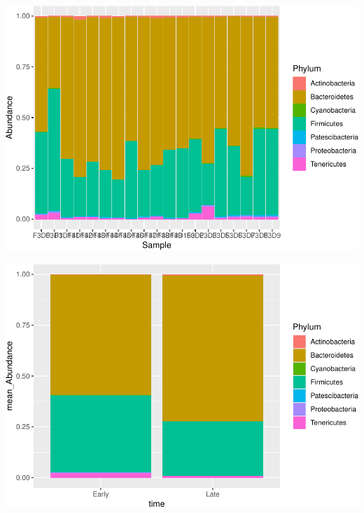 \documentclass[
]{book}
\newenvironment{Shaded}{\begin{snugshade}}{\end{snugshade}}
\newcommand{\DataTypeTok}[1]{\textcolor[rgb]{0.13,0.29,0.53}{#1}}
\newcommand{\KeywordTok}[1]{\textcolor[rgb]{0.13,0.29,0.53}{\textbf{#1}}}
\newcommand{\NormalTok}[1]{#1}
\newcommand{\OperatorTok}[1]{\textcolor[rgb]{0.81,0.36,0.00}{\textbf{#1}}}
\newcommand{\StringTok}[1]{\textcolor[rgb]{0.31,0.60,0.02}{#1}}
\begin{document}
\includegraphics{16sworkshop_files/figure-latex/unnamed-chunk-2-1.pdf}

\begin{Shaded}
\end{Shaded}

\includegraphics{16sworkshop_files/figure-latex/unnamed-chunk-2-2.pdf}
\end{document}
